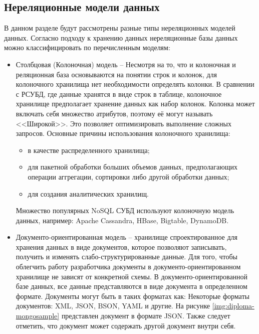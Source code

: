 \subsection{Нереляционные модели данных}
В данном разделе будут рассмотрены разные типы нереляционных моделей данных.
Согласно подходу к хранению данных нереляционные базы данных можно классифицировать по перечисленным моделям:
\begin{itemize}[label=---]
    \item Столбцовая (Колоночная) модель -- Несмотря на то, что и колоночная и реляционная база основываются на понятии строк и колонок,
    для колоночного хранилища нет необходимости определять колонки. %
    В сравнении с РСУБД, где данные хранятся в виде строк в таблице, колоночное хранилище предполагает хранение данных как набор колонок.
    Колонка может включать себя множество атрибутов, поэтому её могут называть <<Широкой>>.
    Это позволяет оптимизировать выполнение сложных запросов.
    Основные причины использования колоночного хранилища:
    \begin{itemize}[label=---]
        \item в качестве распределенного хранилища;
        \item для пакетной обработки больших объемов данных,
        предполагающих операции аггрегации,
        сортировки либо другой обработки данных;
        \item для создания аналитических хранилищ. 
    \end{itemize} 
    
    Множество популярных NoSQL СУБД используют колоночную модель данных, например: 
    Apache Cassandra, HBase, Bigtable, DynamoDB.

    \item Документо-ориентированная модель -- хранилище спроектированное для хранения данных в виде документов,
    которое позволяют записывать, получить и изменять слабо-структурированные данные.
    Для того, чтобы облегчить работу разработчика документы в документо-ориентированном хранилище не зависят от конкретной схемы.
    В документо-ориентированной базе данных, все данные представляются в виде документа в определенном формате.
    Документы могут быть в таких форматах как: 
    Некоторые форматы документов: XML, JSON, BSON, YAML и другие.
    На рисунке \ref{img:diploma-mongosample} представлен документ в формате JSON.
    Также следует отметить, что документ может содержать другой документ внутри себя.
    

\end{itemize}
